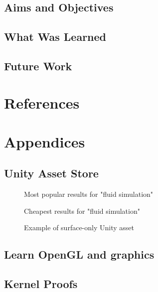 \documentclass[12pt]{article}
\newcommand{\wideimage}[2][]{%
  \makebox[\textwidth][c]{\texttt{[image: \#2]}}%
}
\begin{document}
    \subsection{Aims and Objectives}
    \subsection{What Was Learned}
    \subsection{Future Work}

    \newpage

    \section{References}
    \label{sec:references}
    

    \newpage

    \section{Appendices}
    \label{sec:appendices}

    \subsection{Unity Asset Store}

    \begin{figure}[H]
        \wideimage[]{unityStore1.png}
        \caption{Most popular results for "fluid simulation" \cite{unityasset}}
    \end{figure}

    \begin{figure}[H]
        \wideimage[]{unityStore2.png}
        \caption{Cheapest results for "fluid simulation" \cite{unityasset}}
    \end{figure}

    \begin{figure}[H]
        \wideimage[]{stylizedWaterURP.png}
        \caption{Example of surface-only Unity asset \cite{stylized}}
    \end{figure}

    \subsection{Learn OpenGL and graphics}

    \subsection{Kernel Proofs}
\end{document}
